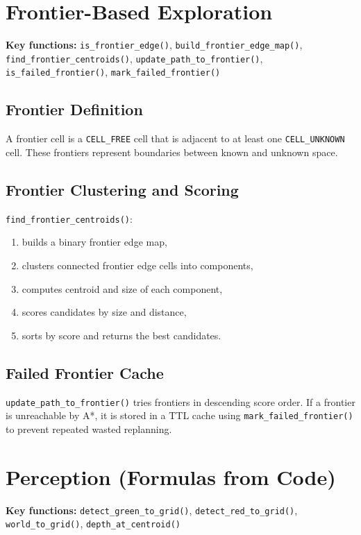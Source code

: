 \documentclass[12pt,a4paper]{article}
\begin{document}
\section{Frontier-Based Exploration}
\textbf{Key functions:} \texttt{is\_frontier\_edge()}, \texttt{build\_frontier\_edge\_map()},
\texttt{find\_frontier\_centroids()}, \texttt{update\_path\_to\_frontier()},
\texttt{is\_failed\_frontier()}, \texttt{mark\_failed\_frontier()}

\subsection{Frontier Definition}
A frontier cell is a \texttt{CELL\_FREE} cell that is adjacent to at least one \texttt{CELL\_UNKNOWN} cell. These frontiers represent boundaries between known and unknown space.

\subsection{Frontier Clustering and Scoring}
\texttt{find\_frontier\_centroids()}:
\begin{enumerate}[leftmargin=2em]
  \item builds a binary frontier edge map,
  \item clusters connected frontier edge cells into components,
  \item computes centroid and size of each component,
  \item scores candidates by size and distance,
  \item sorts by score and returns the best candidates.
\end{enumerate}

\subsection{Failed Frontier Cache}
\texttt{update\_path\_to\_frontier()} tries frontiers in descending score order. If a frontier is unreachable by A*, it is stored in a TTL cache using \texttt{mark\_failed\_frontier()} to prevent repeated wasted replanning.

\section{Perception (Formulas from Code)}
\textbf{Key functions:} \texttt{detect\_green\_to\_grid()}, \texttt{detect\_red\_to\_grid()}, \texttt{world\_to\_grid()}, \texttt{depth\_at\_centroid()}
\end{document}
